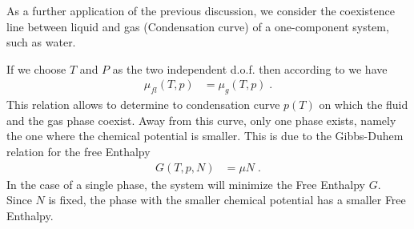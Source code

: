 As a further application of the previous discussion, we consider the coexistence line between
liquid and gas (Condensation curve) of a one-component system, such as water. 

If we choose $T$ and $P$ as the two independent d.o.f. then according to 
 we have
%
\begin{align}\label{eq:mu:coexist}
\mu_{fl}(T,p) &= \mu_{g}(T,p)\;.
\end{align}
%
This relation allows to determine to condensation curve $p(T)$ on which the fluid and the gas phase coexist. Away from this curve, only one phase exists, namely the one where the chemical potential is smaller. This is due to the Gibbs-Duhem relation for the free Enthalpy
%
\begin{align*}
G(T,p,N) &= \mu N\;.
\end{align*}
% 
In the case of a single phase, the system will minimize the Free Enthalpy $G$. Since $N$ is fixed,
the phase with  the smaller chemical potential has a smaller Free Enthalpy.

